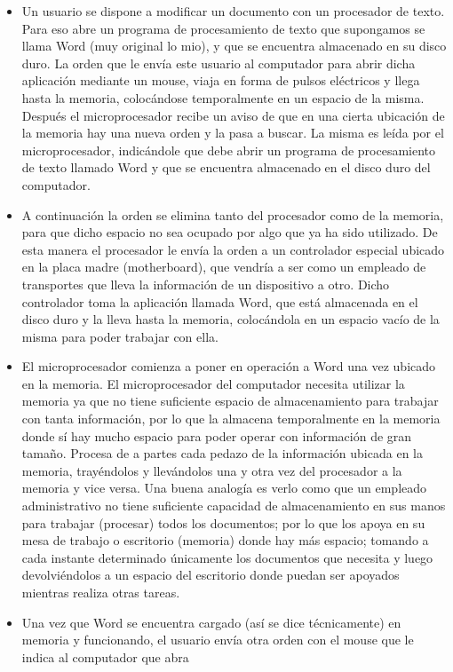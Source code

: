 \documentclass{article}
\begin{document}
\begin{itemize}
\item Un usuario se dispone a modificar un documento con un procesador de texto. Para eso abre
un programa de procesamiento de texto que supongamos se llama Word (muy original lo
mio), y que se encuentra almacenado en su disco duro. La orden que le envía este usuario
al computador para abrir dicha aplicación mediante un mouse, viaja en forma de pulsos
eléctricos y llega hasta la memoria, colocándose temporalmente en un espacio de la misma.
Después el microprocesador recibe un aviso de que en una cierta ubicación de la memoria
hay una nueva orden y la pasa a buscar. La misma es leída por el microprocesador,
indicándole que debe abrir un programa de procesamiento de texto llamado Word y que se
encuentra almacenado en el disco duro del computador.
\item A continuación la orden se elimina tanto del procesador como de la memoria, para que
dicho espacio no sea ocupado por algo que ya ha sido utilizado. De esta manera el
procesador le envía la orden a un controlador especial ubicado en la placa madre
(motherboard), que vendría a ser como un empleado de transportes que lleva la
información de un dispositivo a otro. Dicho controlador toma la aplicación llamada Word,
que está almacenada en el disco duro y la lleva hasta la memoria, colocándola en un espacio
vacío de la misma para poder trabajar con ella.
\item El microprocesador comienza a poner en operación a Word una vez ubicado en la memoria.
El microprocesador del computador necesita utilizar la memoria ya que no tiene suficiente
espacio de almacenamiento para trabajar con tanta información, por lo que la almacena
temporalmente en la memoria donde sí hay mucho espacio para poder operar con
información de gran tamaño. Procesa de a partes cada pedazo de la información ubicada en
la memoria, trayéndolos y llevándolos una y otra vez del procesador a la memoria y vice
versa. Una buena analogía es verlo como que un empleado administrativo no tiene
suficiente capacidad de almacenamiento en sus manos para trabajar (procesar) todos los
documentos; por lo que los apoya en su mesa de trabajo o escritorio (memoria) donde hay
más espacio; tomando a cada instante determinado únicamente los documentos que
necesita y luego devolviéndolos a un espacio del escritorio donde puedan ser apoyados
mientras realiza otras tareas.
\item Una vez que Word se encuentra cargado (así se dice técnicamente) en memoria y
funcionando, el usuario envía otra orden con el mouse que le indica al computador que abra

\end{itemize}
\end{document}
